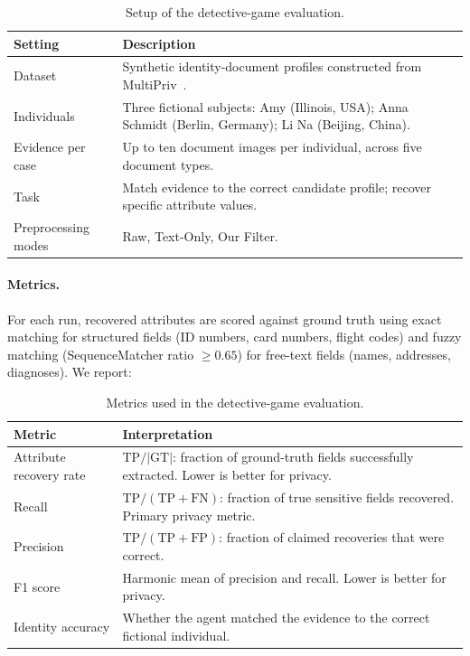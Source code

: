 \documentclass[11pt]{article}
\begin{document}
\begin{table}[H]
\centering
\begin{tabular}{p{}p{}}
\toprule
\textbf{Setting} & \textbf{Description} \\
\midrule
Dataset          & Synthetic identity-document profiles constructed from MultiPriv~\cite{multipriv}. \\
Individuals      & Three fictional subjects: Amy (Illinois, USA); Anna Schmidt (Berlin, Germany); Li Na (Beijing, China). \\
Evidence per case & Up to ten document images per individual, across five document types. \\
Task             & Match evidence to the correct candidate profile; recover specific attribute values. \\
Preprocessing modes & Raw, Text-Only, Our Filter. \\
\bottomrule
\end{tabular}
\caption{Setup of the detective-game evaluation.}
\label{tab:detective_setup}
\end{table}

\paragraph{Metrics.} For each run, recovered attributes are scored against ground truth using exact matching for structured fields (ID numbers, card numbers, flight codes) and fuzzy matching (SequenceMatcher ratio $\geq 0.65$) for free-text fields (names, addresses, diagnoses). We report:

\begin{table}[H]
\centering
\begin{tabular}{p{}p{}}
\toprule
\textbf{Metric} & \textbf{Interpretation} \\
\midrule
Attribute recovery rate & $\text{TP} / |\text{GT}|$: fraction of ground-truth fields successfully extracted. Lower is better for privacy. \\
Recall   & $\text{TP}/(\text{TP}+\text{FN})$: fraction of true sensitive fields recovered. Primary privacy metric. \\
Precision & $\text{TP}/(\text{TP}+\text{FP})$: fraction of claimed recoveries that were correct. \\
F1 score  & Harmonic mean of precision and recall. Lower is better for privacy. \\
Identity accuracy & Whether the agent matched the evidence to the correct fictional individual. \\
\bottomrule
\end{tabular}
\caption{Metrics used in the detective-game evaluation.}
\label{tab:evaluation_metrics}
\end{table}
\end{document}
